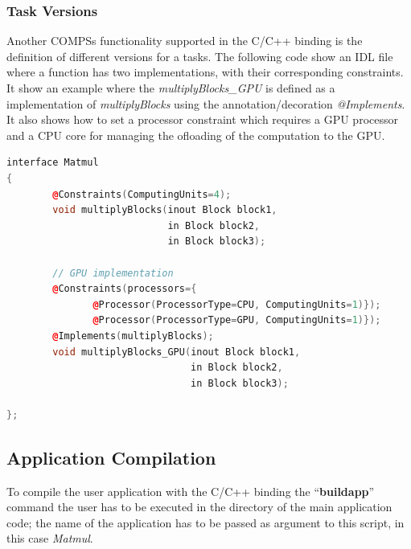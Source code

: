 \subsubsection{Task Versions}
Another COMPSs functionality supported in the C/C++ binding is the definition of different versions for a tasks. 
The following code show an IDL file where a function has two implementations, with their corresponding constraints. 
It show an example where the \textit{multiplyBlocks\_GPU} is defined as a implementation of \textit{multiplyBlocks} using the annotation/decoration \textit{@Implements}. 
It also shows how to set a processor constraint which requires a GPU processor and a CPU core for managing the ofloading of the computation to the GPU. 
\begin{lstlisting}[language=C++]
interface Matmul
{
        @Constraints(ComputingUnits=4);
        void multiplyBlocks(inout Block block1, 
                            in Block block2,
                            in Block block3);

        // GPU implementation 
        @Constraints(processors={
               @Processor(ProcessorType=CPU, ComputingUnits=1)});
               @Processor(ProcessorType=GPU, ComputingUnits=1)});
        @Implements(multiplyBlocks);
        void multiplyBlocks_GPU(inout Block block1,
                                in Block block2, 
                                in Block block3); 
                          
};
\end{lstlisting}



\subsection{Application Compilation}
To compile the user application with the C/C++ binding  the ``{\bf buildapp}'' command the user has to be executed in the directory of the main application code; 
the name of the application has to be passed as argument to this script, in this case \textit{Matmul}.

